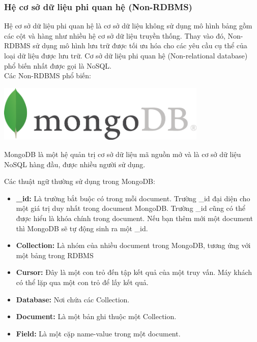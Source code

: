 \subsubsection{Hệ cơ sở dữ liệu phi quan hệ (Non-RDBMS)}
Hệ cơ sở dữ liệu phi quan hệ là cơ sở dữ liệu không sử dụng mô hình bảng gồm các cột và hàng như nhiều hệ cơ sở dữ liệu truyền thống. Thay vào đó, Non-RDBMS sử dụng mô hình lưu trữ được tối ưu hóa cho các yêu cầu cụ thể của loại dữ liệu được lưu trữ. Cơ sở dữ liệu phi quan hệ (Non-relational database) phổ biến nhất được gọi là NoSQL.\\
Các Non-RDBMS phổ biến:
\begin{center}
  \captionsetup{type=figure}
    \includegraphics[width=10cm]{img/mongo.png}
\end{center}

MongoDB là một hệ quản trị cơ sở dữ liệu mã nguồn mở và là cơ sở dữ liệu NoSQL hàng đầu, được nhiều người sử dụng.

Các thuật ngữ thường sử dụng trong MongoDB:
\begin{itemize}
    \item \textbf{\_id:} Là trường bắt buộc có trong mỗi document. Trường \_id đại diện cho một giá trị duy nhất trong document MongoDB. Trường \_id cũng có thể được hiểu là khóa chính trong document. Nếu bạn thêm mới một document thì MongoDB sẽ tự động sinh ra một \_id.
    \item \textbf{Collection:} Là nhóm của nhiều document trong MongoDB, tương ứng với một bảng trong RDBMS
    \item \textbf{Cursor:} Đây là một con trỏ đến tập kết quả của một truy vấn. Máy khách có thể lặp qua một con trỏ để lấy kết quả.
    \item \textbf{Database:} Nơi chứa các Collection.
    \item \textbf{Document:} Là một bản ghi thuộc một Collection.
    \item \textbf{Field:} Là một cặp name-value trong một document.
\end{itemize}

